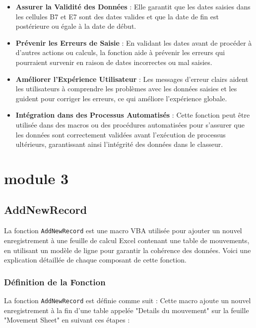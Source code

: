 \documentclass[a4paper, oneside, 12pt, final]{extreport}
\begin{document}
\begin{itemize}
    \item \textbf{Assurer la Validité des Données} : Elle garantit que les dates saisies dans les cellules B7 et E7 sont des dates valides et que la date de fin est postérieure ou égale à la date de début.
    \item \textbf{Prévenir les Erreurs de Saisie} : En validant les dates avant de procéder à d'autres actions ou calculs, la fonction aide à prévenir les erreurs qui pourraient survenir en raison de dates incorrectes ou mal saisies.
    \item \textbf{Améliorer l'Expérience Utilisateur} : Les messages d'erreur clairs aident les utilisateurs à comprendre les problèmes avec les données saisies et les guident pour corriger les erreurs, ce qui améliore l'expérience globale.
    \item \textbf{Intégration dans des Processus Automatisés} : Cette fonction peut être utilisée dans des macros ou des procédures automatisées pour s'assurer que les données sont correctement validées avant l'exécution de processus ultérieurs, garantissant ainsi l'intégrité des données dans le classeur.
\end{itemize}
\section{module 3}
\subsection{AddNewRecord}

La fonction \texttt{AddNewRecord} est une macro VBA utilisée pour ajouter un nouvel enregistrement à une feuille de calcul Excel contenant une table de mouvements, en utilisant un modèle de ligne pour garantir la cohérence des données. Voici une explication détaillée de chaque composant de cette fonction.

\subsubsection{Définition de la Fonction}

La fonction \texttt{AddNewRecord} est définie comme suit :
Cette macro ajoute un nouvel enregistrement à la fin d'une table appelée "Details du mouvement" sur la feuille "Movement Sheet" en suivant ces étapes :
\end{document}
